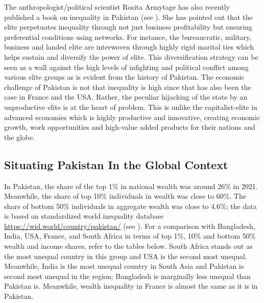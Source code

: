 \documentclass[12pt]{article}
\newcommand{\1}{\mathbbm 1}
\begin{document}
	
	
	
	
	
	
	The anthropologist/political scientist Rosita Armytage has also recently published a book on inequality in Pakistan (see \cite{armytage2020big}). She has pointed out that the elite perpetuates inequality through not just business profitability but ensuring preferential conditions using networks. For instance, the bureaucratic, military, business and landed elite are interwoven through highly rigid marital ties which helps sustain and diversify the power of elite. This diversification strategy can be seen as a wall against the high levels of infighting and political conflict among various elite groups as is evident from the history of Pakistan. The economic challenge of Pakistan is not that inequality is high since that has also been the case in France and the USA. Rather, the peculiar hijacking of the state by an unproductive elite is at the heart of problem. This is unlike the capitalist-elite in advanced economies which is highly productive and innovative, creating economic growth, work opportunities and high-value added products for their nations and the globe.
	
	
	
	
	

     \subsection{Situating Pakistan In the Global Context}
	
	In Pakistan, the share of the top 1\% in national wealth was around 26\% in 2021. Meanwhile, the share of top 10\% individuals in wealth was close to 60\%. The share of bottom 50\% individuals in aggregate wealth was close to 4.6\%; the data is based on standardized world inequality database \url{https://wid.world/country/pakistan/} (see \cite{solt2016standardized}). For a comparison with Bangladesh, India, USA, France, and South Africa in terms of top 1\%, 10\% and bottom 50\% wealth and income shares, refer to the tables below. South Africa stands out as the most unequal country in this group and USA is the second most unequal. Meanwhile, India is the most unequal country in South Asia and Pakistan is second most unequal in the region; Bangladesh is marginally less unequal than Pakistan is. Meanwhile, wealth inequality in France is almost the same as it is in Pakistan. 
	
	
	
	
	
\end{document}
